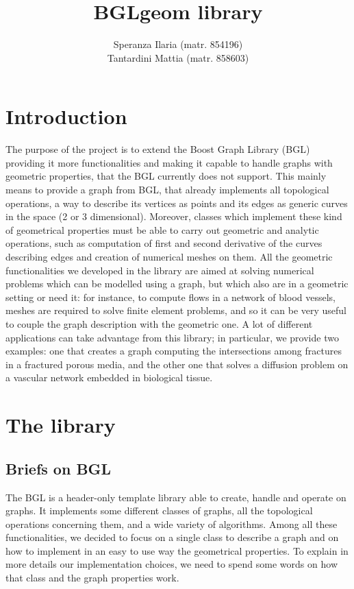 \documentclass[10pt]{article} %
\title{BGLgeom library}
\author{Speranza Ilaria (matr. 854196) \\ Tantardini Mattia (matr. 858603)}
\begin{document}
	\maketitle
	\newpage
	\tableofcontents
	\newpage
	
	\section{Introduction}
	The purpose of the project is to extend the Boost Graph Library (BGL) providing it more functionalities and making it capable to handle graphs with geometric properties, that the BGL currently does not support. This mainly means to provide a graph from BGL, that already implements all topological operations, a way to describe its vertices as points and its edges as generic curves in the space (2 or 3 dimensional). Moreover, classes which implement these kind of geometrical properties must be able to carry out geometric and analytic operations, such as computation of first and second derivative of the curves describing edges and creation of numerical meshes on them. \newline
	All the geometric functionalities we developed in the library are aimed at solving numerical problems which can be modelled using a graph, but which also are in a geometric setting or need it: for instance, to compute flows in a network of blood vessels, meshes are required to solve finite element problems, and so it can be very useful to couple the graph description with the geometric one. \newline
	A lot of different applications can take advantage from this library; in particular, we provide two examples: one that creates a graph computing the intersections among fractures in a fractured porous media, and the other one that solves a diffusion problem on a vascular network embedded in biological tissue.
	
	\section{The library}
	\subsection{Briefs on BGL}
	The BGL is a header-only template library able to create, handle and operate on graphs. It implements some different classes of graphs, all the topological operations concerning them, and a wide variety of algorithms.
	\newline\newline
	Among all these functionalities, we decided to focus on a single class to describe a graph and on how to implement in an easy to use way the geometrical properties. To explain in more details our implementation choices, we need to spend some words on how that class and the graph properties work.
	
\end{document}
